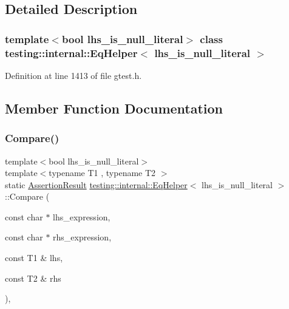 \subsection{Detailed Description}
\subsubsection*{template$<$bool lhs\+\_\+is\+\_\+null\+\_\+literal$>$\newline
class testing\+::internal\+::\+Eq\+Helper$<$ lhs\+\_\+is\+\_\+null\+\_\+literal $>$}



Definition at line 1413 of file gtest.\+h.



\subsection{Member Function Documentation}
\mbox{\label{classtesting_1_1internal_1_1EqHelper_ae3572c7374534a916b9117efaa89f33f}} 
\subsubsection{\texorpdfstring{Compare()}{Compare()}\hspace{0.1cm}{\footnotesize\ttfamily [1/2]}}
{\footnotesize\ttfamily template$<$bool lhs\+\_\+is\+\_\+null\+\_\+literal$>$ \\
template$<$typename T1 , typename T2 $>$ \\
static \hyperlink{classtesting_1_1AssertionResult}{Assertion\+Result} \hyperlink{classtesting_1_1internal_1_1EqHelper}{testing\+::internal\+::\+Eq\+Helper}$<$ lhs\+\_\+is\+\_\+null\+\_\+literal $>$\+::Compare (\begin{DoxyParamCaption}\item[{const char $\ast$}]{lhs\+\_\+expression,  }\item[{const char $\ast$}]{rhs\+\_\+expression,  }\item[{const T1 \&}]{lhs,  }\item[{const T2 \&}]{rhs }\end{DoxyParamCaption})\hspace{0.3cm}{\ttfamily [inline]}, {\ttfamily [static]}}



